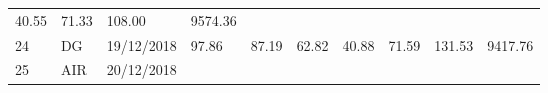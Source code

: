 \documentclass[
  11pt,
]{article}
\begin{document}
\begin{longtable}[]{@{}llllllllll@{}}
\begin{minipage}[t]{0.06\columnwidth}
40.55\strut
\end{minipage} & \begin{minipage}[t]{0.06\columnwidth}\raggedright
71.33\strut
\end{minipage} & \begin{minipage}[t]{0.13\columnwidth}\raggedright
108.00\strut
\end{minipage} & \begin{minipage}[t]{0.08\columnwidth}\raggedright
9574.36\strut
\end{minipage}\tabularnewline
\begin{minipage}[t]{0.04\columnwidth}\raggedright
24\strut
\end{minipage} & \begin{minipage}[t]{0.09\columnwidth}\raggedright
DG\strut
\end{minipage} & \begin{minipage}[t]{0.10\columnwidth}\raggedright
19/12/2018\strut
\end{minipage} & \begin{minipage}[t]{0.06\columnwidth}\raggedright
97.86\strut
\end{minipage} & \begin{minipage}[t]{0.06\columnwidth}\raggedright
87.19\strut
\end{minipage} & \begin{minipage}[t]{0.06\columnwidth}\raggedright
62.82\strut
\end{minipage} & \begin{minipage}[t]{0.06\columnwidth}\raggedright
40.88\strut
\end{minipage} & \begin{minipage}[t]{0.06\columnwidth}\raggedright
71.59\strut
\end{minipage} & \begin{minipage}[t]{0.13\columnwidth}\raggedright
131.53\strut
\end{minipage} & \begin{minipage}[t]{0.08\columnwidth}\raggedright
9417.76\strut
\end{minipage}\tabularnewline
\begin{minipage}[t]{0.04\columnwidth}\raggedright
25\strut
\end{minipage} & \begin{minipage}[t]{0.09\columnwidth}\raggedright
AIR\strut
\end{minipage} & \begin{minipage}[t]{0.10\columnwidth}\raggedright
20/12/2018\strut
\end{minipage} & \begin{minipage}[t]{0.06\columnwidth}\raggedright

\end{minipage}
\end{longtable}
\end{document}

